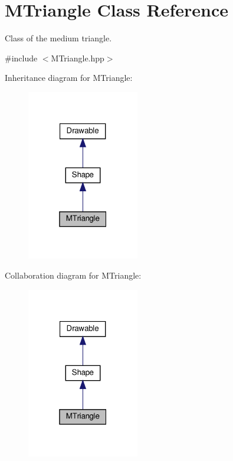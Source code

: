 \hypertarget{classMTriangle}{}\section{M\+Triangle Class Reference}
\label{classMTriangle}


Class of the medium triangle.  




{\ttfamily \#include $<$M\+Triangle.\+hpp$>$}



Inheritance diagram for M\+Triangle\+:\nopagebreak
\begin{figure}[H]
\begin{center}
\leavevmode
\includegraphics[width=139pt]{classMTriangle__inherit__graph}
\end{center}
\end{figure}


Collaboration diagram for M\+Triangle\+:\nopagebreak
\begin{figure}[H]
\begin{center}
\leavevmode
\includegraphics[width=139pt]{classMTriangle__coll__graph}
\end{center}
\end{figure}
